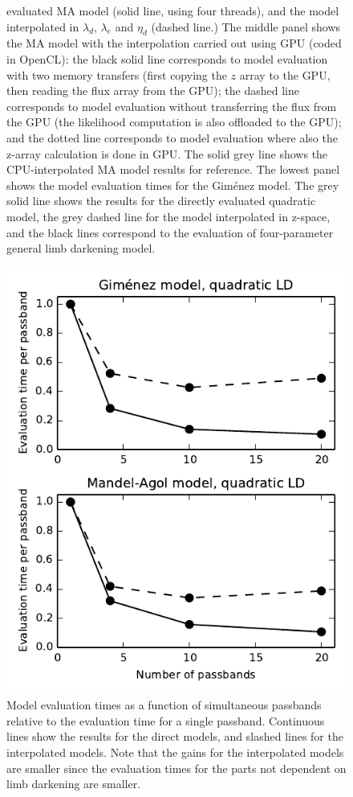 \documentclass[usenatbib,usegraphicx,useAMS]{mn2e}
\newcommand{\gimenez}{Gim\'enez\xspace}
\begin{document}
{\begin{figure}
{evaluated MA model (solid line, using four threads), and the model interpolated in $\lambda_d$, $\lambda_e$ and $\eta_d$ 
(dashed line.) The middle panel shows the MA model with the interpolation carried out using GPU (coded in OpenCL): the 
black solid line corresponds to model evaluation with two memory transfers (first copying the $z$ array to the GPU, then 
reading the flux array from the GPU); the dashed line corresponds to model evaluation without transferring the flux from 
the GPU (the likelihood computation is also offloaded to the GPU); and the dotted line corresponds to model evaluation 
where also the z-array calculation is done in GPU. The solid grey line shows the CPU-interpolated MA model results for 
reference. The lowest panel shows the model evaluation times for the \gimenez model. The grey solid line shows the 
results for the directly evaluated quadratic model, the grey dashed line for the model interpolated in z-space, and the 
black lines correspond to the evaluation of four-parameter general limb darkening model.}
 \label{fig:basic_scalability}
\end{figure}

\begin{figure}
 \centering
 \includegraphics[width=\columnwidth]{evaluation_time_per_passband.pdf}
 \caption{Model evaluation times as a function of simultaneous passbands relative to the evaluation time for a single 
passband. Continuous lines show the results for the direct models, and slashed lines for the interpolated models. Note 
that the gains for the interpolated models are smaller since the evaluation times for the parts not dependent on limb 
darkening are smaller.} \label{fig:evaluation_time_per_passband}
\end{figure}

}
\end{document}
